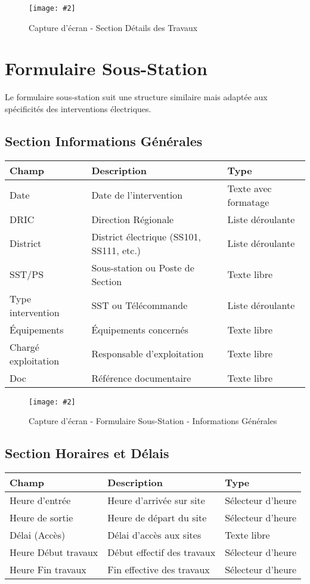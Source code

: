 \documentclass[12pt,a4paper]{report}
\newcommand{\screenshot}[3][]{%
\begin{figure}[H]
\centering
\texttt{[image: \#2]}
\caption{#3}
\end{figure}
}
\begin{document}
\screenshot{travaux_cat.png}{Capture d'écran - Section Détails des Travaux}

\section{Formulaire Sous-Station}

Le formulaire sous-station suit une structure similaire mais adaptée aux spécificités des interventions électriques.

\subsection{Section Informations Générales}

\begin{table}[H]
\centering
\begin{tabular}{|p{3cm}|p{8cm}|p{3cm}|}
\hline
\textbf{Champ} & \textbf{Description} & \textbf{Type} \\
\hline
Date & Date de l'intervention & Texte avec formatage \\
\hline
DRIC & Direction Régionale & Liste déroulante \\
\hline
District & District électrique (SS101, SS111, etc.) & Liste déroulante \\
\hline
SST/PS & Sous-station ou Poste de Section & Texte libre \\
\hline
Type intervention & SST ou Télécommande & Liste déroulante \\
\hline
Équipements & Équipements concernés & Texte libre \\
\hline
Chargé exploitation & Responsable d'exploitation & Texte libre \\
\hline
Doc & Référence documentaire & Texte libre \\
\hline
\end{tabular}
\end{table}

\screenshot{for_ss.jpeg}{Capture d'écran - Formulaire Sous-Station - Informations Générales}

\subsection{Section Horaires et Délais}

\begin{table}[H]
\centering
\begin{tabular}{|p{4cm}|p{7cm}|p{3cm}|}
\hline
\textbf{Champ} & \textbf{Description} & \textbf{Type} \\
\hline
Heure d'entrée & Heure d'arrivée sur site & Sélecteur d'heure \\
\hline
Heure de sortie & Heure de départ du site & Sélecteur d'heure \\
\hline
Délai (Accès) & Délai d'accès aux sites & Texte libre \\
\hline
Heure Début travaux & Début effectif des travaux & Sélecteur d'heure \\
\hline
Heure Fin travaux & Fin effective des travaux & Sélecteur d'heure \\
\hline
\end{tabular}
\end{table}
\end{document}

